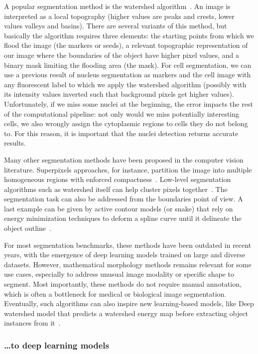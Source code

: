 A popular segmentation method is the watershed algorithm~\cite{Vincent_1991}.
An image is interpreted as a local topography (higher values are peaks and crests, lower values valleys and basins).
There are several variants of this method, but basically the algorithm requires three elements: the starting points from which we flood the image (the markers or seeds), a relevant topographic representation of our image where the boundaries of the object have higher pixel values, and a binary mask limiting the flooding area (the mask).
For cell segmentation, we can use a previous result of nucleus segmentation as markers and the cell image with any fluorescent label to which we apply the watershed algorithm (possibly with its intensity values inverted such that background pixels get higher values).
Unfortunately, if we miss some nuclei at the beginning, the error impacts the rest of the computational pipeline: not only would we miss potentially interesting cells, we also wrongly assign the cytoplasmic regions to cells they do not belong to.
For this reason, it is important that the nuclei detection returns accurate results.

Many other segmentation methods have been proposed in the computer vision literature.
Superpixels approaches, for instance, partition the image into multiple homogeneous regions with enforced compactness~\cite{Ren_2003}.
Low-level segmentation algorithms such as watershed itself can help cluster pixels together~\cite{Machairas_2014}.
The segmentation task can also be addressed from the boundaries point of view.
A last example can be given by active contour models (or snake) that rely on energy minimization techniques to deform a spline curve until it delineate the object outline~\cite{kass_snakes_1988}.

For most segmentation benchmarks, these methods have been outdated in recent years, with the emergence of deep learning models trained on large and diverse datasets.
However, mathematical morphology methods remains relevant for some use cases, especially to address unusual image modality or specific shape to segment.
Most importantly, these methods do not require manual annotation, which is often a bottleneck for medical or biological image segmentation.
Eventually, such algorithms can also inspire new learning-based models, like Deep watershed model that predicts a watershed energy map before extracting object instances from it~\cite{Bai_2017_CVPR}.

\subsubsection{\dots to deep learning models}

